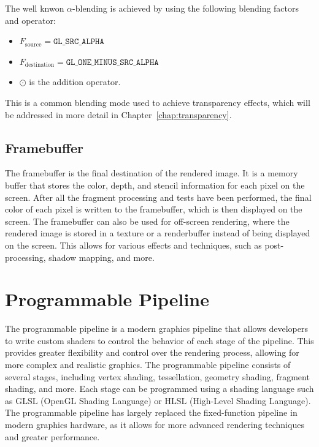 The well knwon $\alpha$-blending is achieved by using the following blending factors and operator:
\begin{itemize}
    \item $F_{\text{source}} = \texttt{GL\_SRC\_ALPHA}$
    \item $F_{\text{destination}} = \texttt{GL\_ONE\_MINUS\_SRC\_ALPHA}$
    \item $\odot$ is the addition operator.
\end{itemize}
This is a common blending mode used to achieve transparency effects, which will be addressed in more detail in Chapter~\ref{chap:transparency}.

\subsection{Framebuffer}

The framebuffer is the final destination of the rendered image. It is a memory buffer that stores the color, depth, and stencil information for each pixel on the screen. After all the fragment processing and tests have been performed, the final color of each pixel is written to the framebuffer, which is then displayed on the screen. The framebuffer can also be used for off-screen rendering, where the rendered image is stored in a texture or a renderbuffer instead of being displayed on the screen. This allows for various effects and techniques, such as post-processing, shadow mapping, and more.

\section{Programmable Pipeline}

The programmable pipeline is a modern graphics pipeline that allows developers to write custom shaders to control the behavior of each stage of the pipeline. This provides greater flexibility and control over the rendering process, allowing for more complex and realistic graphics. The programmable pipeline consists of several stages, including vertex shading, tessellation, geometry shading, fragment shading, and more. Each stage can be programmed using a shading language such as GLSL (OpenGL Shading Language) or HLSL (High-Level Shading Language). The programmable pipeline has largely replaced the fixed-function pipeline in modern graphics hardware, as it allows for more advanced rendering techniques and greater performance.